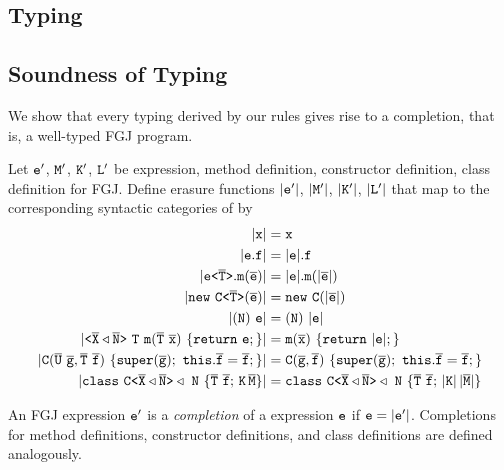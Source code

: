 
\subsection{Typing}
\label{chapter:type-rules}


\subsection{Soundness of Typing}
\label{sec:soundness-typing}

We show that every typing derived by our \TFGJ rules gives rise to a
completion, that is, a well-typed FGJ program.
\begin{definition}[Erasure]
  Let ${\tt e}'$, ${\tt M}'$, ${\tt K}'$, ${\tt L}'$ be expression, method definition, constructor definition, class definition for FGJ. Define erasure functions 
  $|{\tt e}'|$, $|{\tt M}'|$, $|{\tt K}'|$, $|{\tt L}'|$ that map to the corresponding syntactic categories of \TFGJ by
  \begin{align*}
    \Erase{\mv x} &= \mv x \\
    \Erase{\mv e.\mv f} &= \Erase{\mv e}.\mv f \\
    \Erase{\exptype{e}{\ol T}.\mathtt{m}(\ol{e})} &= \Erase{\mv e}. \mathtt{m} (\Erase{\ol e}) \\
    \Erase{\mathtt{new}\ \exptype{C}{\ol T}(\ol{e})} & = \mathtt{new}\ \mv{C}(\Erase{\ol{e}}) \\
    \Erase{(\mv N)\ \mv e} & = (\mv N)\ \Erase{\mv e} \\
    \Erase{\exptype{}{\ol{X} \triangleleft \ol{N}}\ \mv{T}\ \mathtt{m}(\ol T\ \ol{x})\ \{ \mathtt{
    return}\ \mv e; \}} & = \mathtt{m}(\ol{x})\ \{ \mathtt{ return}\ \Erase{\mv e}; \} \\
    \Erase{\mv C(\ol{U}\ \ol{g}, \ol{T}\ \ol{f})\ \{\mathtt{super}(\ol{g}); \ \mathtt{this}.\ol{f}=\ol{f};\}} & = \mv C(\ol{g}, \ol{f})\ \{\mathtt{super}(\ol{g}); \ \mathtt{this}.\ol{f}=\ol{f};\} \\
    \Erase{\mathtt{class} \ \exptype{C}{\ol{X} \triangleleft \ol{N}} \triangleleft \ \mv N\ \{ \ol{T} \ \ol{f}; \,\mv K \, \ol{M} \}} & = 
    \mathtt{class} \ \exptype{C}{\ol{X} \triangleleft \ol{N}} \triangleleft \ \mv N\ \{ \ol{T} \ \ol{f}; \,\Erase{\mv K} \, \Erase{\ol{M}} \}
  \end{align*}
\end{definition}
\begin{definition}[Completion]
  An FGJ expression ${\tt e}'$ is a \emph{completion} of a \TFGJ expression ${\tt e}$ if ${\tt e} = |{\tt e}'|$. Completions for method definitions, constructor definitions, and class definitions
  are defined analogously.
\end{definition}
